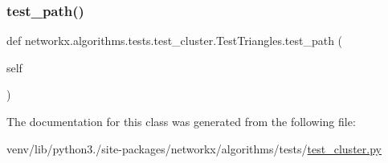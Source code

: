 \subsubsection{\texorpdfstring{test\+\_\+path()}{test\_path()}}
{\footnotesize\ttfamily def networkx.\+algorithms.\+tests.\+test\+\_\+cluster.\+Test\+Triangles.\+test\+\_\+path (\begin{DoxyParamCaption}\item[{}]{self }\end{DoxyParamCaption})}



The documentation for this class was generated from the following file\+:\begin{DoxyCompactItemize}
\item 
venv/lib/python3./site-\/packages/networkx/algorithms/tests/\hyperlink{tests_2test__cluster_8py}{test\+\_\+cluster.\+py}\end{DoxyCompactItemize}
